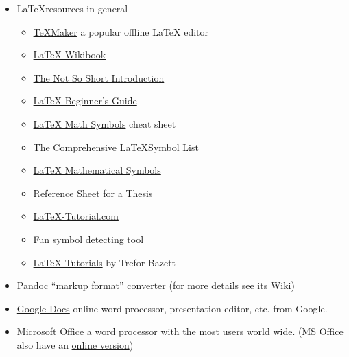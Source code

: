 \documentclass{article}
\begin{document}
\begin{itemize}
\begin{itemize}
            \item \LaTeX  resources in general
            \begin{itemize}
                \item \href{https://www.xm1math.net/texmaker/}{TeXMaker} a popular offline LaTeX editor
                \item \href{https://en.wikibooks.org/wiki/LaTeX}{LaTeX Wikibook}
                \item \href{https://tobi.oetiker.ch/lshort/lshort.pdf}{The Not So Short Introduction}
                \item \href{https://static.latexstudio.net/wp-content/uploads/2015/03/LaTeX_Beginners_Guide.pdf}{LaTeX Beginner's Guide}
                \item \href{https://www.math.uci.edu/~xiangwen/pdf/LaTeX-Math-Symbols.pdf}{LaTeX Math Symbols} cheat sheet
                \item \href{https://tug.ctan.org/info/symbols/comprehensive/symbols-a4.pdf}{The Comprehensive \LaTeX Symbol List}
                \item \href{https://www.caam.rice.edu/~heinken/latex/symbols.pdf}{LaTeX Mathematical Symbols}
                \item \href{http://tug.ctan.org/info/latex-refsheet/LaTeX_RefSheet.pdf}{Reference Sheet for a Thesis}
                \item \href{https://latex-tutorial.com/}{LaTeX-Tutorial.com}
                \item \href{https://detexify.kirelabs.org/classify.html}{Fun symbol detecting tool}
                \item \href{https://www.youtube.com/playlist?list=PLHXZ9OQGMqxcWWkx2DMnQmj5os2X5ZR73}{LaTeX Tutorials} by Trefor Bazett
            \end{itemize}

            \item \href{https://pandoc.org/}{Pandoc} ``markup format'' converter (for more details see its \href{https://en.wikipedia.org/wiki/Pandoc}{Wiki})
            
            \item \href{https://www.google.com/docs/}{Google Docs} online word processor, presentation editor, etc. from Google.
            
            \item \href{https://www.office.com/}{Microsoft Office} a word processor with the most users world wide. (\href{https://en.wikipedia.org/wiki/Microsoft_Office}{MS Office} also have an \href{https://www.microsoft.com/en-us/microsoft-365/free-office-online-for-the-web}{online version})
            

\end{itemize}
\end{itemize}
\end{document}
